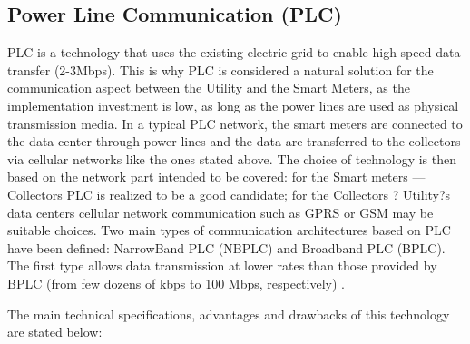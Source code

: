 \documentclass[11pt,final,onecolumn]{IEEEtran}
\begin{document}
\subsection{Power Line Communication (PLC)}\label{plc}
PLC is a technology that uses the existing electric grid to enable high-speed data transfer (2-3Mbps). This is why PLC is considered a natural solution for the communication aspect between the Utility and the Smart Meters, as the implementation investment is low, as long as the power lines are used as physical transmission media.
In a typical PLC network, the smart meters are connected to the data center through power lines and the data are transferred to the collectors via cellular networks like the ones stated above. The choice of technology is then based on the network part intended to be covered: for the Smart meters --- Collectors PLC is realized to be a good candidate; for the Collectors ? Utility?s data centers cellular network communication such as GPRS or GSM may be suitable choices.
Two main types of communication architectures based on PLC have been defined: NarrowBand PLC (NBPLC) and Broadband PLC (BPLC). The first type allows data transmission at lower rates than those provided by BPLC (from few dozens of kbps to 100 Mbps, respectively)  \cite{Sabbah2014}.

The main technical specifications, advantages and drawbacks of this technology are stated below:
\end{document}
